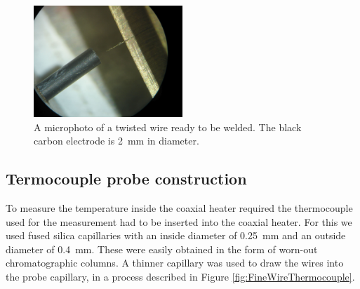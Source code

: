 \begin{figure}
	\centering
	\includegraphics[width=0.5\textwidth]{./Figures/WelderMicro.jpg}
	\decoRule
	
\caption[A microphoto of a thermocouple twist ready to be welded.]{A microphoto
of a twisted wire ready to be welded. The black carbon electrode is
\SI{2}{\milli\metre} in diameter.}
	
	\label{fig:TCWeldMicro}
\end{figure}

\subsection{Termocouple probe construction}

To measure the temperature inside the coaxial heater required the thermocouple
used for the measurement had to be inserted into the coaxial heater. For this we
used fused silica capillaries with an inside diameter of \SI{0.25}{\milli\metre}
and an outside diameter of \SI{0.4}{\milli\metre}. These were easily obtained in
the form of worn-out chromatographic columns. A thinner capillary was used to
draw the wires into the probe capillary, in a process described in Figure
\ref{fig:FineWireThermocouple}.


